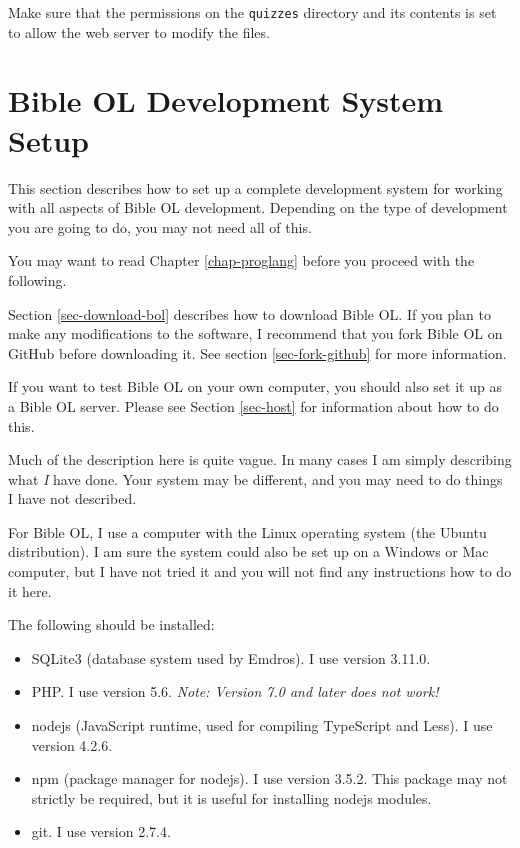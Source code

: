 \documentclass[11pt,oneside,a4paper]{memoir}
\begin{document}
Make sure that the permissions on the \texttt{quizzes} directory and its contents is set to allow
the web server to modify the files.

\section{Bible OL Development System Setup}\label{sec-devel}

This section describes how to set up a complete development system for working with all aspects of
Bible OL development. Depending on the type of development you are going to do, you may not need all
of this.

You may want to read Chapter \ref{chap-proglang} before you proceed with the following.

Section \ref{sec-download-bol} describes how to download Bible OL. If you plan to make any
modifications to the software, I recommend that you fork Bible OL on GitHub
before downloading it. See section \ref{sec-fork-github} for more information.

If you want to test Bible OL on your own computer, you should also set it up as a Bible OL server.
Please see Section \ref{sec-host} for information about how to do this.

Much of the description here is quite vague. In many cases I am simply describing what \emph{I} have
done. Your system may be different, and you may need to do things I have not described.

For Bible OL, I use a computer with the Linux operating system (the
Ubuntu distribution). I am sure the system could also be set up on a
Windows or Mac computer, but I have not tried it and you will not find any
instructions how to do it here.

The following should be installed:

\begin{itemize}
\item SQLite3 (database system used by Emdros). I use version 3.11.0.
\item PHP. I use version 5.6. \emph{Note: Version 7.0 and later does not work!}
\item nodejs (JavaScript runtime, used for compiling TypeScript and Less). I use version
  4.2.6.
\item npm (package manager for nodejs). I use version 3.5.2.
  This package may not strictly be required, but it is useful for installing nodejs modules.
\item git. I use version 2.7.4.
\end{itemize}
\end{document}
